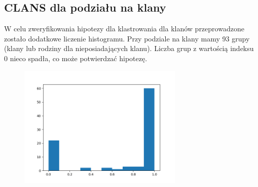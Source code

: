 \documentclass[12pt]{article}
\begin{document}
\subsection{CLANS dla podziału na klany}
W celu zweryfikowania hipotezy dla klastrowania dla klanów przeprowadzone zostało dodatkowe liczenie histogramu.
Przy podziale na klany mamy 93 grupy (klany lub rodziny dla nieposiadających klanu). Liczba grup z wartością indeksu 0 nieco spadła, co może potwierdzać hipotezę.

\begin{figure}[H]
\begin{center}
\includegraphics[width=0.7\textwidth]{myplot_klany}
\end{center}
\end{figure}
\end{document}
